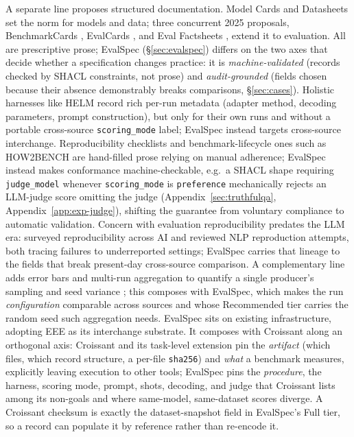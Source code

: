 \documentclass[11pt]{article}
\begin{document}
A separate line proposes structured documentation. Model Cards \citep{mitchell2019}
and Datasheets \citep{gebru2021} set the norm for models and data; three concurrent
2025 proposals, BenchmarkCards \citep{sokol2025}, EvalCards \citep{dhar2025}, and
Eval Factsheets \citep{bordes2025}, extend it to evaluation. All are prescriptive
prose; EvalSpec (\S\ref{sec:evalspec}) differs on the two axes that decide whether a
specification changes practice: it is \emph{machine-validated} (records checked by
SHACL constraints, not prose) and \emph{audit-grounded} (fields chosen because their
absence demonstrably breaks comparisons, \S\ref{sec:cases}). Holistic harnesses like HELM \citep{liang2023helm} record rich
per-run metadata (adapter method, decoding parameters, prompt construction), but
only for their own runs and without a portable cross-source \texttt{scoring\_mode}
label; EvalSpec instead targets cross-source interchange. Reproducibility checklists \citep{pineau2021reproducibility} and
benchmark-lifecycle ones such as HOW2BENCH \citep{cao2025how2bench} are hand-filled
prose relying on manual adherence; EvalSpec instead makes conformance
machine-checkable, e.g.\ a SHACL shape requiring \texttt{judge\_model} whenever
\texttt{scoring\_mode} is \texttt{preference} mechanically rejects an LLM-judge score
omitting the judge (Appendix~\ref{sec:truthfulqa}, Appendix~\ref{app:exp-judge}),
shifting the guarantee from voluntary compliance to automatic validation. Concern
with evaluation reproducibility predates the LLM era: \citet{gundersen2018reproducibility}
surveyed reproducibility across AI and \citet{belz2021systematic} reviewed NLP
reproduction attempts, both tracing failures to underreported settings; EvalSpec
carries that lineage to the fields that break present-day cross-source comparison. A complementary line adds error bars and multi-run aggregation to quantify a single
producer's sampling and seed variance \citep{miller2024errorbars}; this composes with
EvalSpec, which makes the run \emph{configuration} comparable across sources and whose
Recommended tier carries the random seed such aggregation needs. EvalSpec sits on
existing infrastructure, adopting EEE as its interchange substrate. It composes with Croissant
\citep{akhtar2024croissant} along an orthogonal axis: Croissant and its task-level
extension \citep{croissanttasks2026} pin the \emph{artifact} (which files, which
record structure, a per-file \texttt{sha256}) and \emph{what} a benchmark measures,
explicitly leaving execution to other tools; EvalSpec pins the \emph{procedure},
the harness, scoring mode, prompt, shots, decoding, and judge that Croissant lists
among its non-goals and where same-model, same-dataset scores diverge. A Croissant
checksum is exactly the dataset-snapshot field in EvalSpec's Full tier, so a record
can populate it by reference rather than re-encode it.
\end{document}
